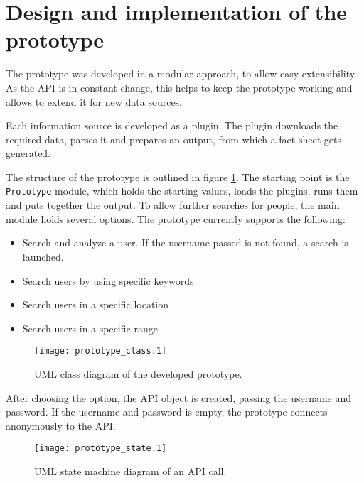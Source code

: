 \section{Design and implementation of the prototype}

The prototype was developed in a modular approach, to allow easy extensibility.
As the \Twitter{} API is in constant change, this helps to keep the prototype
working and allows to extend it for new data sources.

Each information source is developed as a plugin. The plugin downloads the
required data, parses it and prepares an output, from which a fact sheet gets
generated.

The structure of the prototype is outlined in figure \ref{fig:prototype_class}.
The starting point is the \texttt{Prototype} module, which holds the starting
values, loads the plugins, runs them and puts together the output. To allow
further searches for people, the main module holds several options. The
prototype currently supports the following:

\begin{itemize}
  \item Search and analyze a user. If the username passed is not found, a
  search is launched.
  \item Search users by using specific keywords
  \item Search users in a specific location
  \item Search users in a specific range
\end{itemize}

\begin{figure}[ht]
  \begin{center}
    \texttt{[image: prototype\_class.1]}
    \label{fig:prototype_class}
    \caption{UML class diagram of the developed prototype.}
  \end{center}
\end{figure}

After choosing the option, the API object is created, passing the username and
password. If the username and password is empty, the prototype connects
anonymously to the \Twitter{} API.

\begin{figure}[ht]
  \begin{center}
    \texttt{[image: prototype\_state.1]}
    \label{fig:prototype_state}
    \caption{UML state machine diagram of an \Twitter{} API call.}
  \end{center}
\end{figure}

